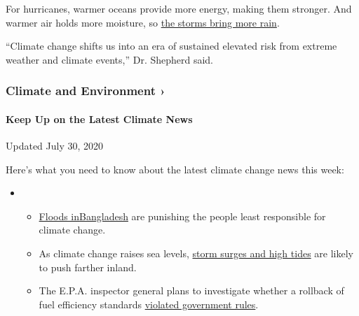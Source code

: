 For hurricanes, warmer oceans provide more energy, making them stronger.
And warmer air holds more moisture, so
\href{https://www.nytimes.com/2019/07/11/climate/hurricane-tropical-storms.html}{the
storms bring more rain}.

``Climate change shifts us into an era of sustained elevated risk from
extreme weather and climate events,'' Dr. Shepherd said.

\href{https://www.nytimes.com/section/climate?action=click\&pgtype=Article\&state=default\&region=MAIN_CONTENT_1\&context=storylines_keepup}{}

\hypertarget{climate-and-environment-}{%
\subsubsection{Climate and Environment
›}\label{climate-and-environment-}}

\hypertarget{keep-up-on-the-latest-climate-news}{%
\paragraph{Keep Up on the Latest Climate
News}\label{keep-up-on-the-latest-climate-news}}

Updated July 30, 2020

Here's what you need to know about the latest climate change news this
week:

\begin{itemize}
\item
  \begin{itemize}
  \tightlist
  \item
    \href{https://www.nytimes.com/2020/07/30/climate/bangladesh-floods.html?action=click\&pgtype=Article\&state=default\&region=MAIN_CONTENT_1\&context=storylines_keepup}{Floods
    in}\href{https://www.nytimes.com/2020/07/30/climate/bangladesh-floods.html?action=click\&pgtype=Article\&state=default\&region=MAIN_CONTENT_1\&context=storylines_keepup}{Bangladesh}
    are punishing the people least responsible for climate change.
  \item
    As climate change raises sea levels,
    \href{https://www.nytimes.com/2020/07/30/climate/sea-level-inland-floods.html?action=click\&pgtype=Article\&state=default\&region=MAIN_CONTENT_1\&context=storylines_keepup}{storm
    surges and high tides} are likely to push farther inland.
  \item
    The E.P.A. inspector general plans to investigate whether a rollback
    of fuel efficiency standards
    \href{https://www.nytimes.com/2020/07/27/climate/trump-fuel-efficiency-rule.html?action=click\&pgtype=Article\&state=default\&region=MAIN_CONTENT_1\&context=storylines_keepup}{violated
    government rules}.
  \end{itemize}
\end{itemize}

